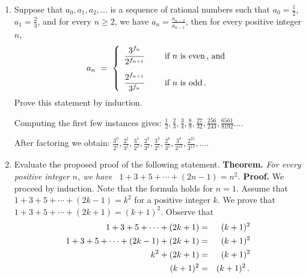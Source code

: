 \documentclass[12pt]{article}
\begin{document}
\begin{enumerate}
   
\item  Suppose that $a_0, a_1,a_2,\dotsc$ is a sequence of rational numbers such that
  $a_0=\frac{1}{2}$,
  $a_1=\frac{2}{3}$, and for every $n\geq 2$, we have
  $a_n=\frac{a_{n-2}}{a_{n-1}}$, then for every positive integer $n$,
  \[
  a_n\ =\ \left\{ \begin{array}{rcl}
    {\displaystyle\frac{3^{f_n}}{2^{f_{n+1}}}} &\ & \mbox{if $n$ is even\,,\ and}\vspace{10pt}\\
    {\displaystyle\frac{2^{f_{n+1}}}{3^{f_n}}} & & \mbox{if $n$ is odd\,.}
  \end{array}\right.
  \]
  Prove this statement by induction.

  Computing the first few instances gives:
  $\frac{1}{2},\frac{2}{3},\frac{3}{4},\frac{8}{9},\frac{27}{32},\frac{256}{243},\frac{6561}{8192}...$.

  After factoring we obtain:
  $\frac{3^0}{2^1},\frac{2^1}{3^1}, \frac{3^1}{2^2},\frac{2^3}{3^2}, \frac{3^3}{2^5},\frac{2^8}{3^5},
  \frac{3^8}{2^{13}},\frac{2^{21}}{3^{13}},\ldots$. 

  \newpage

\item Evaluate the proposed proof of the following statement.\newline
  {\bf Theorem.}  {\sl For every positive integer $n$, we have \ 
    $1+3+5+\dotsb+(2n-1)=n^2$.}\newline
  {\bf Proof.}  We proceed by induction.  Note that the formula holds for  $n=1$.
  Assume that  $1+3+5+\dotsb+(2k-1)=k^2$ for a positive integer $k$.
  We prove that $1+3+5+\dotsb+(2k+1)=(k+1)^2$.
  Observe that\vspace{-5pt}
  \begin{eqnarray*}
   1+3+5+\dotsb+(2k+1)&=&(k+1)^2\\
   1+3+5+\dotsb+(2k-1)+(2k+1)&=&(k+1)^2\\
   k^2+(2k+1)&=&(k+1)^2\\
   (k+1)^2&=&(k+1)^2\,.
   \begin{picture}(1,0)\put(110,0){$\Box$}\end{picture}
  \end{eqnarray*}



\end{enumerate}
\end{document}
